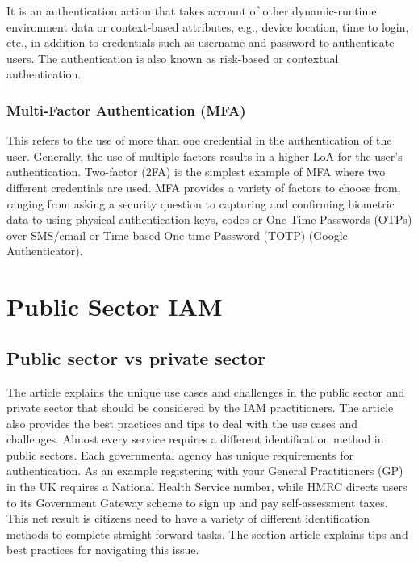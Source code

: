 It is an authentication action that takes account of other
dynamic-runtime environment data or context-based attributes, e.g.,
device location, time to login, etc., in addition to credentials such as
username and password to authenticate users. The authentication is also
known as risk-based or contextual authentication.

\hypertarget{multi-factor-authentication-mfa}{%
\subsection{Multi-Factor Authentication
(MFA)}\label{multi-factor-authentication-mfa}}

This refers to the use of more than one credential in the authentication
of the user. Generally, the use of multiple factors results in a higher
LoA for the user's authentication. Two-factor (2FA) is the simplest
example of MFA where two different credentials are used. MFA provides a
variety of factors to choose from, ranging from asking a security
question to capturing and confirming biometric data to using physical
authentication keys, codes or One-Time Passwords (OTPs) over SMS/email
or Time-based One-time Password (TOTP) (Google Authenticator).~

\hypertarget{public-sector-iam}{%
\chapter{Public Sector IAM}\label{public-sector-iam}}

\hypertarget{public-sector-vs-private-sector}{%
\section{Public sector vs private
sector}\label{public-sector-vs-private-sector}}

The article explains the unique use cases and challenges in the public
sector and private sector that should be considered by the IAM
practitioners. The article also provides the best practices and tips to
deal with the use cases and challenges. Almost every service requires a
different identification method in public sectors. Each governmental
agency has unique requirements for authentication. As an example
registering with your General Practitioners (GP) in the UK requires a
National Health Service number, while HMRC directs users to its
Government Gateway scheme to sign up and pay self-assessment taxes. This
net result is citizens need to have a variety of different
identification methods to complete straight forward tasks. The section
article explains tips and best practices for navigating this issue.

